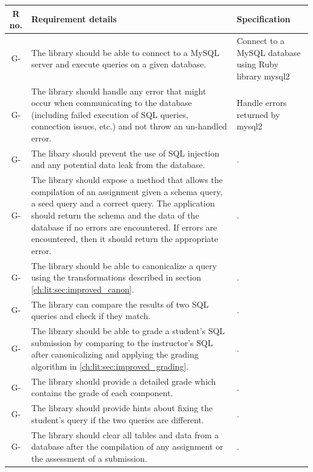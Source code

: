 \begin{tabularx}{\textwidth}{|c|Y|Y|}
  \hline
  \textbf{R no.} & \textbf{Requirement details} & \textbf{Specification} \\\hline
  \endhead
G- & The library should be able to connect to a MySQL server and execute queries on a given database. & Connect to a MySQL database using Ruby library mysql2 \\\hline
G- & The library should handle any error that might occur when communicating to the database (including failed execution of SQL queries, connection issues, etc.) and not throw an un-handled error. & Handle errors returned by mysql2 \\\hline
G- & The libary should prevent the use of SQL injection and any potential data leak from the database. & .\\\hline
G- & The library should expose a method that allows the compilation of an assignment given a schema query, a seed query and a correct query. The application should return the schema and the data of the database if no errors are encountered. If errors are encountered, then it should return the appropriate error. & .\\\hline
G- & The library should be able to canonicalize a query using the transformations described in section \ref{ch:lit:sec:improved_canon}. & .\\\hline
G- & The library can compare the results of two SQL queries and check if they match. & .\\\hline
G- & The library should be able to grade a student's SQL submission by comparing to the instructor's SQL after canonicalizing and applying the grading algorithm in \ref{ch:lit:sec:improved_grading}. & .\\\hline
G- & The library should provide a detailed grade which contains the grade of each component. & .\\\hline
G- & The library should provide hints about fixing the student's query if the two queries are different. & .\\\hline
G- & The library should clear all tables and data from a database after the compilation of any assignment or the assessment of a submission. & .\\\hline
\end{tabularx}
